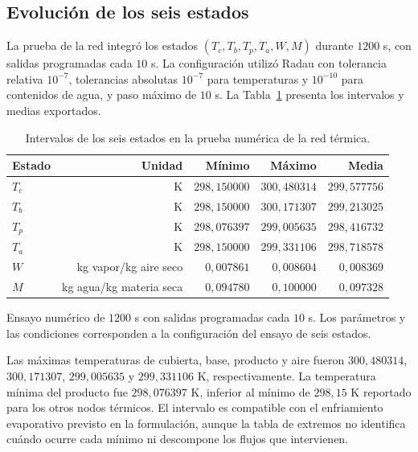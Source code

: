 \subsection{Evolución de los seis estados}

La prueba de la red integró los estados $(T_c,T_b,T_p,T_a,W,M)$ durante $1200$ s, con salidas programadas cada $10$ s. La configuración utilizó Radau con tolerancia relativa $10^{-7}$, tolerancias absolutas $10^{-7}$ para temperaturas y $10^{-10}$ para contenidos de agua, y paso máximo de $10$ s. La Tabla~\ref{tab:res_red_estados} presenta los intervalos y medias exportados.

\begin{table}[htbp]
\centering
\caption{Intervalos de los seis estados en la prueba numérica de la red térmica.}
\label{tab:res_red_estados}
\small
\setlength{\tabcolsep}{5pt}
\begin{tabular}{lrrrr}
\toprule
Estado & Unidad & Mínimo & Máximo & Media \\
\midrule
$T_c$ & K & $298{,}150000$ & $300{,}480314$ & $299{,}577756$ \\
$T_b$ & K & $298{,}150000$ & $300{,}171307$ & $299{,}213025$ \\
$T_p$ & K & $298{,}076397$ & $299{,}005635$ & $298{,}416732$ \\
$T_a$ & K & $298{,}150000$ & $299{,}331106$ & $298{,}718578$ \\
$W$ & kg vapor/kg aire seco & $0{,}007861$ & $0{,}008604$ & $0{,}008369$ \\
$M$ & kg agua/kg materia seca & $0{,}094780$ & $0{,}100000$ & $0{,}097328$ \\
\bottomrule
\end{tabular}
\par\vspace{3pt}
\begin{minipage}{0.98\textwidth}\footnotesize
Ensayo numérico de $1200$ s con salidas programadas cada $10$ s. Los parámetros y las condiciones corresponden a la configuración del ensayo de seis estados.
\end{minipage}
\end{table}


Las máximas temperaturas de cubierta, base, producto y aire fueron $300{,}480314$, $300{,}171307$, $299{,}005635$ y $299{,}331106$ K, respectivamente. La temperatura mínima del producto fue $298{,}076397$ K, inferior al mínimo de $298{,}15$ K reportado para los otros nodos térmicos. El intervalo es compatible con el enfriamiento evaporativo previsto en la formulación, aunque la tabla de extremos no identifica cuándo ocurre cada mínimo ni descompone los flujos que intervienen.


